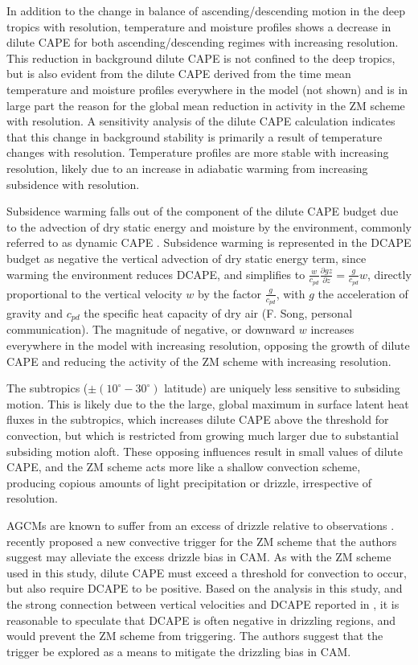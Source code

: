 \documentclass[times]{qjrms4}
\begin{document}
In addition to the change in balance of ascending/descending motion in the deep tropics with resolution, temperature and moisture profiles shows a decrease in dilute CAPE for both ascending/descending regimes with increasing resolution. This reduction in background dilute CAPE is not confined to the deep tropics, but is also evident from the dilute CAPE derived from the time mean temperature and moisture profiles everywhere in the model (not shown) and is in large part the reason for the global mean reduction in activity in the ZM scheme with resolution. A sensitivity analysis of the dilute CAPE calculation indicates that this change in background stability is primarily a result of temperature changes with resolution. Temperature profiles are more stable with increasing resolution, likely due to an increase in adiabatic warming from increasing subsidence with resolution. 

Subsidence warming falls out of the component of the dilute CAPE budget due to the advection of dry static energy and moisture by the environment, commonly referred to as dynamic CAPE \citep[DCAPE;][]{XZ2000JGR,Z2002JGR}. Subsidence warming is represented in the DCAPE budget as negative the vertical advection of dry static energy term, since warming the environment reduces DCAPE, and simplifies to $\frac{w}{c_{pd}} \frac{\partial gz}{\partial z} = \frac{g}{c_{pd}} w$, directly proportional to the vertical velocity $w$ by the factor $\frac{g}{c_{pd}}$, with $g$ the acceleration of gravity and $c_{pd}$ the specific heat capacity of dry air (F. Song, personal communication). The magnitude of negative, or downward $w$ increases everywhere in the model with increasing resolution, opposing the growth of dilute CAPE and reducing the activity of the ZM scheme with increasing resolution.

The subtropics ($\pm (10^{\circ}-30^{\circ})$ latitude) are uniquely less sensitive to subsiding motion. This is likely due to the the large, global maximum in surface latent heat fluxes in the subtropics, which increases dilute CAPE above the threshold for convection, but which is restricted from growing much larger due to substantial subsiding motion aloft. These opposing influences result in small values of dilute CAPE, and the ZM scheme acts more like a shallow convection scheme, producing copious amounts of light precipitation or drizzle, irrespective of resolution. 

AGCMs are known to suffer from an excess of drizzle relative to observations \citep{D2006JCLIM}. \cite{XETAL2019JAMES} recently proposed a new convective trigger for the ZM scheme that the authors suggest may alleviate the excess drizzle bias in CAM. As with the ZM scheme used in this study, dilute CAPE must exceed a threshold for convection to occur, but \cite{XETAL2019JAMES} also require DCAPE to be positive. Based on the analysis in this study, and the strong connection between vertical velocities and DCAPE reported in \cite{SZ2018JCLIM}, it is reasonable to speculate that DCAPE is often negative in drizzling regions, and would prevent the ZM scheme from triggering. The authors suggest that the \cite{XETAL2019JAMES} trigger be explored as a means to mitigate the drizzling bias in CAM.
\end{document}
